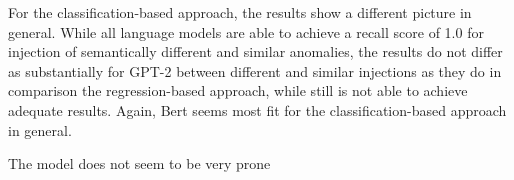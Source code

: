 For the classification-based approach, the results show a different picture in general. While all language models are able to achieve a recall score of 1.0 for injection of semantically different and similar anomalies, the results do not differ as substantially for GPT-2 between different and similar injections as they do in comparison the regression-based approach, while still is not able to achieve adequate results. Again, Bert seems most fit for the classification-based approach in general.

The model does not seem to be very prone





